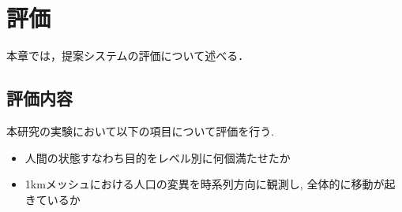 \chapter{評価}
\label{evaluation}

本章では，提案システムの評価について述べる．


\section{評価内容}

本研究の実験において以下の項目について評価を行う.


\begin{itemize}
    \item 人間の状態すなわち目的をレベル別に何個満たせたか
    \item 1kmメッシュにおける人口の変異を時系列方向に観測し, 全体的に移動が起きているか
\end{itemize}


